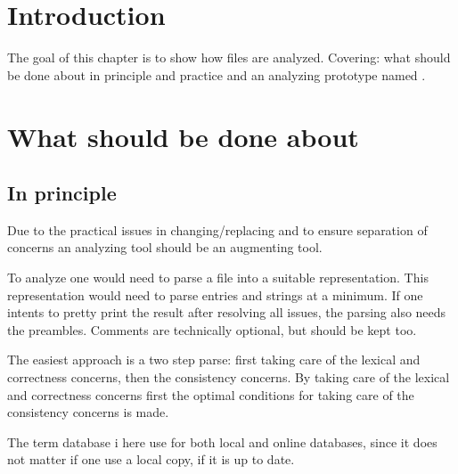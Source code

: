 

\section{Introduction}

The goal of this chapter is to show how {\bibtex} files are analyzed.
Covering: what should be done about {\bibtex} in principle and
practice  and an analyzing prototype
named {\orangutan} .


\section{What should be done about {\bibtex}}
\label{sec:analyzing_what_to_do}
\subsection{In principle}

Due to the practical issues in changing/replacing {\bibtex} and to
ensure separation of concerns an analyzing tool should be an
augmenting tool.

To analyze {\bibtex} one would need to parse a {\bibtex} file into a
suitable representation.  This representation would need to parse
{\bibtex} entries and strings at a minimum.  If one intents to pretty
print the result after resolving all issues, the parsing also needs
the preambles.  Comments are technically optional, but should be kept
too.

The easiest approach is a two step parse: first taking care of the
lexical and correctness concerns, then the consistency concerns.  By
taking care of the lexical and correctness concerns first the optimal
conditions for taking care of the consistency concerns is made.

The term database i here use for both local and online databases,
since it does not matter if one use a local copy, if it is up to date.


